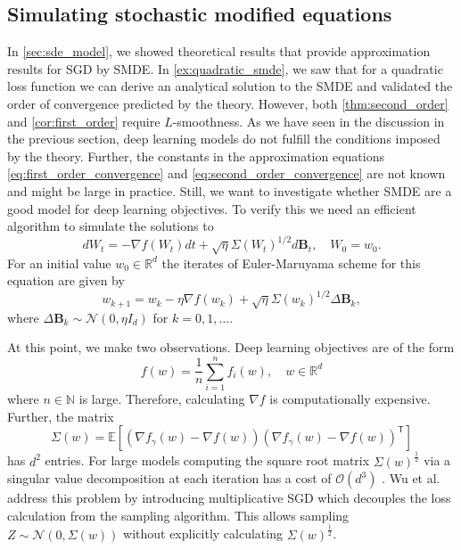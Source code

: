 \documentclass[12pt]{article}
\theoremstyle{definition}
\numberwithin{equation}{section}
\newcommand{\N}{\mathbb{N}}
\newcommand{\R}{\mathbb{R}}
\newcommand{\CN}{\mathcal{N}}
\newcommand{\CO}{\mathcal{O}}
\newcommand{\T}{\mathsf{T}}
\newcommand{\ev}[1]{\mathbb{E}\left[{#1}\right]}
\begin{document}
\subsection{Simulating stochastic modified equations}
In \autoref{sec:sde_model}, we showed theoretical results that provide approximation results for SGD by SMDE. 
In \autoref{ex:quadratic_smde}, we saw that for a quadratic loss function we can derive an analytical solution to the SMDE and validated the order of convergence predicted by the theory.
However, both \autoref{thm:second_order} and \autoref{cor:first_order} require $L$-smoothness. As we have seen in the discussion in the previous section, deep learning models do not fulfill the conditions imposed by the theory. Further, the constants in the approximation equations \eqref{eq:first_order_convergence} and \eqref{eq:second_order_convergence} are not known and might be large in practice. 
Still, we want to investigate whether SMDE are a good model for deep learning objectives. To verify this we need an efficient algorithm to simulate the solutions to 
\begin{equation}
  d W_t = -\nabla f(W_t) dt + \sqrt{\eta}\Sigma(W_t)^{1/2}d\mathbf{B}_t, \quad W_0 = w_0.
\end{equation}
For an initial value $w_0 \in \R^d$ the iterates of Euler-Maruyama scheme for this equation are given by 
\begin{equation}
  w_{k+1} = w_k -\eta\nabla f(w_k) + \sqrt{\eta}\Sigma(w_k)^{1/2} \Delta \mathbf{B}_k,
\end{equation}
where $\Delta \mathbf{B}_k \sim \CN(0, \eta I_d)$ for $k=0,1,\dots$.

At this point, we make two observations. Deep learning objectives are of the form
\begin{equation*}
  f(w) = \frac{1}{n}\sum_{i=1}^n f_i(w), \quad w \in \R^d
\end{equation*}
where $n \in \N$ is large. Therefore, calculating $\nabla f$ is computationally expensive. Further, the matrix
\begin{equation*}
  \Sigma(w)= \ev{(\nabla f_{\gamma}(w) - \nabla f(w))(\nabla f_{\gamma}(w) - \nabla f(w))^\T}
\end{equation*}
has $d^2$ entries. For large models computing the square root matrix $\Sigma(w)^{\frac{1}{2}}$ via a singular value decomposition at each iteration has a cost of $\CO(d^3)$ \cite{golubMatrixComputations1996}.
Wu et al. \cite{wuNoisyGradientDescent2020a} address this problem by introducing multiplicative SGD which decouples the loss calculation from the sampling algorithm. This allows sampling $Z \sim \CN(0, \Sigma(w))$ without explicitly calculating $\Sigma(w)^{\frac{1}{2}}$.
\end{document}
